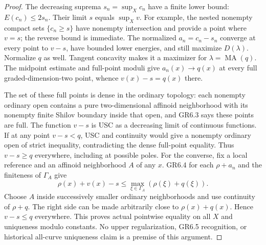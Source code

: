 \documentclass[11pt]{article}
\newcommand{\MA}{\operatorname{MA}}
\begin{document}
\begin{proof}
The decreasing suprema $s_n=\sup_Xc_n$ have a finite lower bound:
$E(c_n)\le2s_n$. Their limit $s$ equals $\sup_Xv$. For example,
the nested nonempty compact sets $\{c_n\ge s\}$ have nonempty
intersection and provide a point where $v=s$; the reverse bound is
immediate. The normalized $a_n=c_n-s_n$ converge at every point to
$v-s$, have bounded lower energies, and still maximize $D(\lambda)$.
Normalize $q$ as well. Tangent concavity makes it a maximizer for
$\lambda=\MA(q)$. The midpoint estimate and full-point moduli give
$a_n(x)\to q(x)$ at every full graded-dimension-two point, whence
$v(x)-s=q(x)$ there.

The set of these full points is dense in the ordinary topology:
each nonempty ordinary open contains a pure two-dimensional affinoid
neighborhood with its nonempty finite Shilov boundary inside that
open, and GR6.3 says these points are full. The function $v-s$ is
USC as a decreasing limit of continuous functions. If at any point
$v-s<q$, USC and continuity would give a nonempty ordinary open of
strict inequality, contradicting the dense full-point equality.
Thus $v-s\ge q$ everywhere, including at possible poles.
For the converse, fix a local reference and an affinoid neighborhood
$A$ of any $x$. GR6.4 for each $\rho+a_n$ and the finiteness of
$\Gamma_A$ give
\[
 \rho(x)+v(x)-s\le
 \max_{\xi\in\Gamma_A}(\rho(\xi)+q(\xi)).
\]
Choose $A$ inside successively smaller ordinary neighborhoods and use
continuity of $\rho+q$. The right side can be made arbitrarily close
to $\rho(x)+q(x)$. Hence $v-s\le q$ everywhere. This proves actual
pointwise equality on all $X$ and uniqueness modulo constants.
No upper regularization, GR6.5 recognition, or historical all-curve
uniqueness claim is a premise of this argument.
\end{proof}
\end{document}
